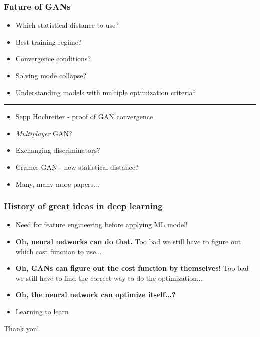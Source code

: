 \documentclass{Bredelebeamer}
\begin{document}
\begin{frame}
	\frametitle{Future of GANs}
	\begin{itemize}[<+->]
		\item Which statistical distance to use?
		\item Best training regime?
		\item Convergence conditions?
		\item Solving mode collapse?
		\item Understanding models with multiple optimization criteria?
	\end{itemize}

	\pause[6]
	\noindent\rule{8cm}{0.4pt}
	\begin{itemize}[<+->]
		\item Sepp Hochreiter - proof of GAN convergence
		\item \textit{Multiplayer} GAN? 
		\item Exchanging discriminators?
		\item Cramer GAN - new statistical distance?
		\item Many, many more papers...
	\end{itemize}
\end{frame}
\begin{frame}
\frametitle{History of great ideas in deep learning}

\begin{itemize}[<+(1)->]
	\item Need for feature engineering before applying ML model!
	\item \textbf{Oh, neural networks can do that.} Too bad we still have to figure out which cost function to use...
	\item \textbf{Oh, GANs can figure out the cost function by themselves!} Too bad we still have to find the correct way to do the optimization...
	\item \textbf{Oh, the neural network can optimize itself...?}
	\item Learning to learn 
\end{itemize}

\end{frame}


\begin{frame}
\Huge{\centerline{Thank you!}}
\end{frame}

\end{document}
